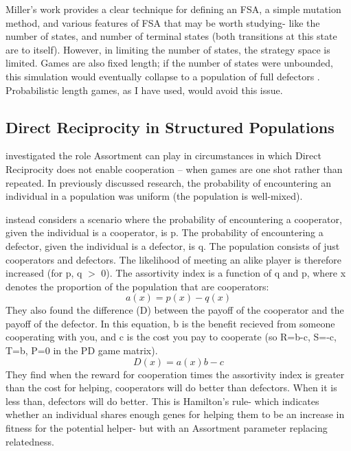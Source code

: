 \documentclass[a4paper,11pt,bcshonoursthesis,singlespace,oneside,thesisdraft,pdflatex]{cssethesis}
\begin{document}
Miller's work provides a clear technique for defining an FSA, a simple mutation method, and various features of FSA that may be worth studying- like the number of states, and number of terminal states (both transitions at this state are to itself). However, in limiting the number of states, the strategy space is limited. Games are also fixed length; if the number of states were unbounded, this simulation would eventually collapse to a population of full defectors \citep{aumann1995backward}. Probabilistic length games, as I have used, would avoid this issue.

\subsection{Direct Reciprocity in Structured Populations}
\label{sec:pnas}
\citet{bergstrom2003algebra} investigated the role Assortment can play in circumstances in which Direct Reciprocity does not enable cooperation -- when games are one shot rather than repeated. 
In previously discussed research, the probability of encountering an individual in a population was uniform (the population is well-mixed). 

\citet{bergstrom2003algebra} instead considers a scenario where the probability of encountering a cooperator, given the individual is a cooperator, is p. The probability of encountering a defector, given the individual is a defector, is q. 
The population consists of just cooperators and defectors. The likelihood of meeting an alike player is therefore increased (for p, q $>$ 0). The assortivity index is a function of q and p, where x denotes the proportion of the population that are cooperators:
\begin{equation*}
a(x)=p(x)-q(x)
\end{equation*}
They also found the difference (D) between the payoff of the cooperator and the payoff of the defector. 
In this equation, b is the benefit recieved from someone cooperating with you, and c is the cost you pay to cooperate (so R=b-c, S=-c, T=b, P=0 in the PD game matrix).
\begin{equation}
D(x)=a(x)b-c
\end{equation}
They find when the reward for cooperation times the assortivity index is greater than the cost for helping, cooperators will do better than defectors. When it is less than, defectors will do better. 
This is Hamilton's rule- which indicates whether an individual shares enough genes for helping them to be an increase in fitness for the potential helper- but with an Assortment parameter replacing relatedness. 
\end{document}
